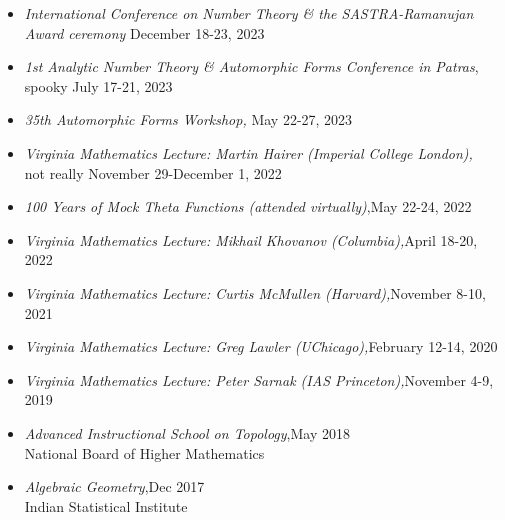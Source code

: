 \documentclass[10pt]{article}
\begin{document}
\begin{itemize}
\item \emph{ International Conference on Number Theory \& the SASTRA-Ramanujan Award ceremony} \hfill December 18-23, 2023\\
\item \emph{1st Analytic Number Theory \& Automorphic Forms Conference in Patras},\\ {\color{white}spooky} \hfill July 17-21, 2023 \\
\item \emph{35th Automorphic Forms Workshop,} \hfill May 22-27, 2023 \\
\item \emph{Virginia Mathematics Lecture: Martin Hairer (Imperial College London),}\\ {\color{white}not really} \hfill November 29-December 1, 2022\\
\item \emph{100 Years of Mock Theta Functions (attended virtually)},\hfill May 22-24, 2022\\
\item \emph{Virginia Mathematics Lecture: Mikhail Khovanov (Columbia),}\hfill April 18-20, 2022 \\
\item \emph{Virginia Mathematics Lecture: Curtis McMullen (Harvard),}\hfill November 8-10, 2021 \\
\item \emph{Virginia Mathematics Lecture: Greg Lawler (UChicago),}\hfill February 12-14, 2020 \\
\item \emph{Virginia Mathematics Lecture: Peter Sarnak (IAS Princeton),}\hfill November 4-9, 2019 \\
\item \emph{Advanced Instructional School on Topology},\hfill May 2018\\ National Board of Higher Mathematics \\
\item \emph{Algebraic Geometry},\hfill Dec 2017\\ Indian Statistical Institute


\end{itemize}
\end{document}
